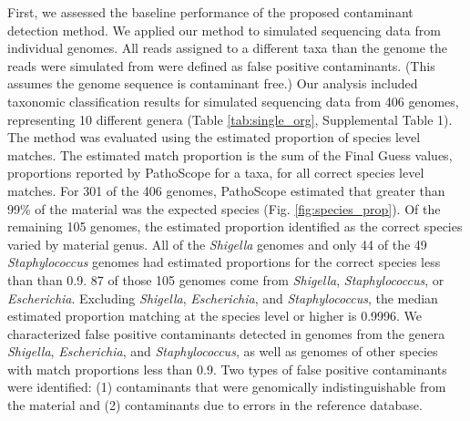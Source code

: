 \documentclass[fleqn,10pt,lineno]{wlpeerj}\usepackage[]{graphicx}\usepackage[]{color}
\begin{document}
First, we assessed the baseline performance of the proposed contaminant detection method. 
We applied our method to simulated sequencing data from individual genomes. 
All reads assigned to a different taxa than the genome the reads were simulated from were defined as false positive contaminants. 
(This assumes the genome sequence is contaminant free.) 
Our analysis included taxonomic classification results for simulated sequencing data  from 406 genomes, representing 10 different genera (Table \ref{tab:single_org}, Supplemental Table 1).
The method was evaluated using the estimated proportion of species level matches.
The estimated match proportion is the sum of the Final Guess values, proportions reported by PathoScope for a taxa, for all correct species level matches.
For 301 of the 406 genomes, PathoScope estimated that greater than 99\% of the material was the expected species (Fig. \ref{fig:species_prop}).
Of the remaining 105 genomes, the estimated proportion identified as the correct species varied by material genus.
All of the \textit{Shigella} genomes and only 44 of the 49 \textit{Staphylococcus} genomes had estimated proportions for the correct species less than than 0.9.
87 of those 105 genomes come from \textit{Shigella}, \textit{Staphylococcus}, or \textit{Escherichia}.
Excluding \textit{Shigella}, \textit{Escherichia}, and \textit{Staphylococcus}, the median estimated proportion matching at the species level or higher is  0.9996.
We characterized false positive contaminants detected in genomes from the genera \textit{Shigella}, \textit{Escherichia}, and \textit{Staphylococcus}, as well as genomes of other species with match proportions less than 0.9.
Two types of false positive contaminants were identified: (1) contaminants that were genomically indistinguishable from the material and (2) contaminants due to errors in the reference database.
\end{document}
